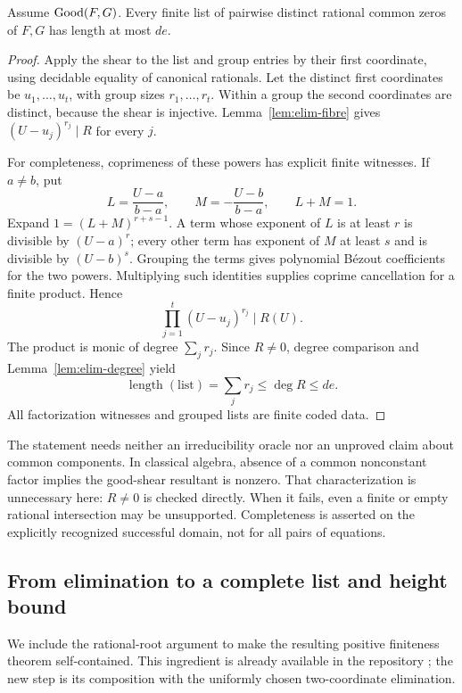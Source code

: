 \begin{theorem}\label{thm:elim-bezout}
Assume \(\operatorname{Good}(F,G)\).  Every finite list of pairwise distinct rational
common zeros of \(F,G\) has length at most \(de\).
\end{theorem}

\begin{proof}
Apply the shear to the list and group entries by their first coordinate,
using decidable equality of canonical rationals.  Let the distinct first
coordinates be \(u_1,\ldots,u_t\), with group sizes
\(r_1,\ldots,r_t\).  Within a group the second coordinates are distinct,
because the shear is injective.  Lemma~\ref{lem:elim-fibre} gives
\((U-u_j)^{r_j}\mid R\) for every \(j\).

For completeness, coprimeness of these powers has explicit finite
witnesses.  If \(a\ne b\), put
\[
 L=\frac{U-a}{b-a},\qquad M=-\frac{U-b}{b-a},\qquad L+M=1.
\]
Expand \(1=(L+M)^{r+s-1}\).  A term whose exponent of \(L\) is at
least \(r\) is divisible by \((U-a)^r\); every other term has exponent
of \(M\) at least \(s\) and is divisible by \((U-b)^s\).  Grouping
the terms gives polynomial B\'ezout coefficients for the two powers.
Multiplying such identities supplies coprime cancellation for a finite
product.  Hence
\[
 \prod_{j=1}^t(U-u_j)^{r_j}\mid R(U).
\]
The product is monic of degree \(\sum_jr_j\).  Since \(R\ne0\),
degree comparison and Lemma~\ref{lem:elim-degree} yield
\[
 \operatorname{length}(\text{list})
     =\sum_jr_j\le\deg R\le de.
\]
All factorization witnesses and grouped lists are finite coded data.
\end{proof}

The statement needs neither an irreducibility oracle nor an unproved
claim about common components.  In classical algebra, absence of a common
nonconstant factor implies the good-shear resultant is nonzero.  That
characterization is unnecessary here: \(R\ne0\) is checked directly.
When it fails, even a finite or empty rational intersection may be
unsupported.  Completeness is asserted on the explicitly recognized
successful domain, not for all pairs of equations.

\subsection{From elimination to a complete list and height bound}

We include the rational-root argument to make the resulting positive
finiteness theorem self-contained.  This ingredient is already available
in the repository \cite{repo-geometry}; the new step is its composition
with the uniformly chosen two-coordinate elimination.

